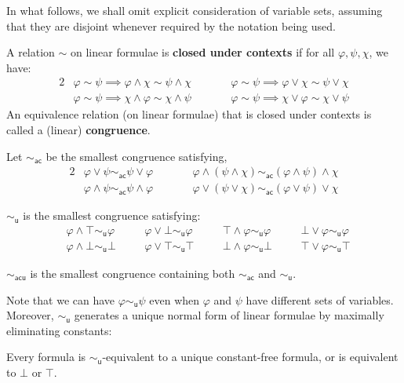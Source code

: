 \documentclass[a4paper, UKenglish, cleveref]{lipics-v2021}
\renewcommand{\phi}{\varphi}
\newcommand{\ac}{\ensuremath{\mathsf{ac}}}
\newcommand{\un}{\ensuremath{\mathsf{u}}}
\newcommand{\acu}{\ensuremath{\mathsf{acu}}}
\begin{document}
In what follows, we shall omit explicit consideration of variable sets, assuming that they are disjoint whenever required by the notation being used.

A relation \(\sim\) on linear formulae is \textbf{closed under contexts} if for all \(\phi,\psi,\chi\), we have:
\begin{alignat*}{2}
  &\phi \sim \psi \implies \phi \land \chi \sim \psi \land \chi &\quad\quad&\phi \sim \psi \implies \phi \lor \chi \sim \psi \lor \chi\\
  &\phi \sim \psi \implies \chi \land \phi \sim \chi \land \psi &&\phi \sim \psi \implies \chi \lor \phi \sim \chi \lor \psi
\end{alignat*}
An equivalence relation (on linear formulae) that is closed under contexts is called a (linear) \textbf{congruence}.

\begin{definition}
Let \(\sim_\ac\) be the smallest congruence satisfying,
\begin{alignat*}{2}
  &\phi \lor \psi \sim_\ac \psi \lor \phi &\quad\quad&\phi \land (\psi \land \chi) \sim_\ac (\phi \land \psi) \land \chi\\
  &\phi \land \psi \sim_\ac \psi \land \phi &&\phi \lor (\psi \lor \chi) \sim_\ac (\phi \lor \psi) \lor \chi
\end{alignat*}

$\sim_\un$ is the smallest congruence satisfying:
\begin{equation}
  \label{eq:un-eq-rel}
  \begin{alignedat}{4}
    &\phi \land \top \sim_\un \phi   &\quad& \phi \lor \bot\sim_\un \phi &\quad&
    \top \land \phi \sim_\un  \phi  &\quad&  \bot \lor \phi \sim_\un \phi  \\
    &\phi \land \bot \sim_\un \bot  && \phi \lor \top \sim_\un \top  &&
    \bot \land \phi \sim_\un \bot  && \top \lor \phi \sim_\un \top
  \end{alignedat}
\end{equation}

\(\sim_\acu\) is the smallest congruence containing both $\sim_\ac$ and $\sim_\un$.
\end{definition}
Note that we can have \(\phi \sim_\un \psi\) even when \(\phi\) and \(\psi\) have different sets of variables.
Moreover, $\sim_\un$ generates a unique normal form of linear formulae by maximally eliminating constants:

\begin{proposition}
  \label{prop:unit-free}
  Every formula is $\sim_\un$-equivalent to a unique constant-free formula, or is equivalent to $\bot$ or $\top$.
\end{proposition}
\end{document}
